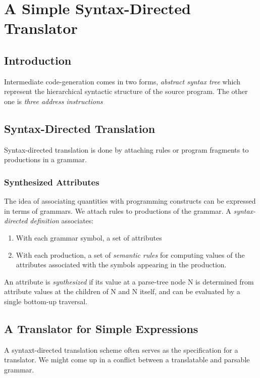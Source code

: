 \documentclass{article}
\begin{document}
\section{A Simple Syntax-Directed Translator} %
\label{sec:A Simple Syntax-Directed Translator}

\subsection{Introduction} %
\label{sub:Introduction}
Intermediate code-generation comes in two forms, \emph{abstract syntax tree} which represent the hierarchical syntactic structure of the source program. The other one is \emph{three address instructions}

\subsection{Syntax-Directed Translation} %
\label{sub:Syntax-Directed Translation}
Syntax-directed translation is done by attaching rules or program fragments to productions in a grammar.

\subsubsection{Synthesized Attributes} %
\label{ssub:Synthesized Attributes}
The idea of associating quantities with programming constructs can be expressed in terms of grammars. We attach rules to productions of the grammar. A \emph{syntax-directed definition} associates:
\begin{enumerate}
	\item With each grammar symbol, a set of attributes
	\item With each production, a set of \emph{semantic rules} for computing values of the attributes associated with the symbols appearing in the production.
\end{enumerate}
An attribute is \emph{synthesized} if its value at a parse-tree node N is determined from attribute values at the children of N and N itself, and can be evaluated by a single bottom-up traversal.


\subsection{A Translator for Simple Expressions} %
\label{sub:A Translator for Simple Expressions}
A syntaxt-directed translation scheme often serves as the specification for a translator. We might come up in a conflict between a translatable and parsable grammar.
\end{document}
